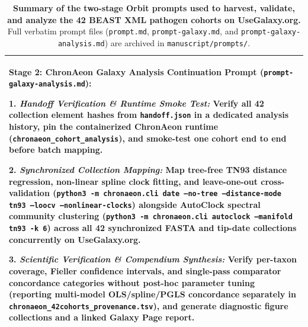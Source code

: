 \documentclass[11pt,letterpaper]{article}
\newcommand{\tool}[1]{\textsf{#1}}
\begin{document}
\begin{table}[!htbp]
\begin{tabularx}{\textwidth}{X}
\textbf{Stage 2: \tool{ChronAeon} Galaxy Analysis Continuation Prompt (\nolinkurl{prompt-galaxy-analysis.md}):} \par\vspace{0.3em}
1. \textit{Handoff Verification \& Runtime Smoke Test:} Verify all 42 collection element hashes from \nolinkurl{handoff.json} in a dedicated analysis history, pin the containerized \tool{ChronAeon} runtime (\nolinkurl{chronaeon_cohort_analysis}), and smoke-test one cohort end to end before batch mapping. \par
2. \textit{Synchronized Collection Mapping:} Map tree-free TN93 distance regression, non-linear spline clock fitting, and leave-one-out cross-validation (\texttt{python3 -m chronaeon.cli date --no-tree --distance-mode tn93 --loocv --nonlinear-clocks}) alongside \tool{AutoClock} spectral community clustering (\texttt{python3 -m chronaeon.cli autoclock --manifold tn93 -k 6}) across all 42 synchronized FASTA and tip-date collections concurrently on UseGalaxy.org. \par
3. \textit{Scientific Verification \& Compendium Synthesis:} Verify per-taxon coverage, Fieller confidence intervals, and single-pass comparator concordance categories without post-hoc parameter tuning (reporting multi-model OLS/spline/PGLS concordance separately in \nolinkurl{chronaeon_42cohorts_provenance.tsv}), and generate diagnostic figure collections and a linked Galaxy Page report. \\
\bottomrule
\end{tabularx}
\caption{\textbf{Summary of the two-stage \tool{Orbit} prompts used to harvest, validate, and analyze the 42 \tool{BEAST} XML pathogen cohorts on UseGalaxy.org.} Full verbatim prompt files (\nolinkurl{prompt.md}, \nolinkurl{prompt-galaxy.md}, and \nolinkurl{prompt-galaxy-analysis.md}) are archived in \nolinkurl{manuscript/prompts/}.}
\label{tab:chronaeon_prompts}
\end{table}
\end{document}
